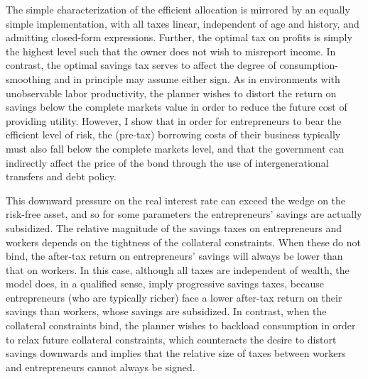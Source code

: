 \documentclass[11pt]{article}
\theoremstyle{plain}
\theoremstyle{definition} %
\begin{document}
The simple characterization of the efficient allocation is mirrored by an equally simple implementation, with all taxes linear, independent of age and history, and admitting closed-form expressions. Further, the optimal tax on profits is simply the highest level such that the owner does not wish to misreport income. In contrast, the optimal savings tax serves to affect the degree of consumption-smoothing and in principle may assume either sign. As in environments with unobservable labor productivity, the planner wishes to distort the return on savings below the complete markets value in order to reduce the future cost of providing utility. However, I show that in order for entrepreneurs to bear the efficient level of risk, the (pre-tax) borrowing costs of their business typically must also fall below the complete markets level, and that the government can indirectly affect the price of the bond through the use of intergenerational transfers and debt policy. 

This downward pressure on the real interest rate can exceed the wedge on the risk-free asset, and so for some parameters the entrepreneurs' savings are actually subsidized. The relative magnitude of the savings taxes on entrepreneurs and workers depends on the tightness of the collateral constraints. When these do not bind, the after-tax return on entrepreneurs' savings will always be lower than that on workers. In this case, although all taxes are independent of wealth, the model does, in a qualified sense, imply progressive savings taxes, because entrepreneurs (who are typically richer) face a lower after-tax return on their savings than workers, whose savings are subsidized. In contrast, when the collateral constraints bind, the planner wishes to backload consumption in order to relax future collateral constraints, which counteracts the desire to distort savings downwards and implies that the relative size of taxes between workers and entrepreneurs cannot always be signed.
\end{document}
